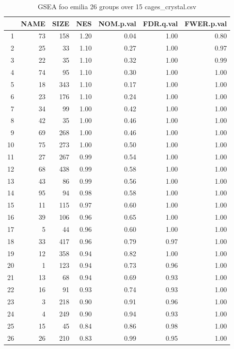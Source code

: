 \begin{table}[ht]
\centering
\begin{tabular}{rrrrrrr}
  \hline
 & NAME & SIZE & NES & NOM.p.val & FDR.q.val & FWER.p.val \\ 
  \hline
1 &  73 & 158 & 1.20 & 0.04 & 1.00 & 0.80 \\ 
  2 &  25 &  33 & 1.10 & 0.27 & 1.00 & 0.97 \\ 
  3 &  22 &  35 & 1.10 & 0.32 & 1.00 & 0.99 \\ 
  4 &  74 &  95 & 1.10 & 0.30 & 1.00 & 1.00 \\ 
  5 &  18 & 343 & 1.10 & 0.17 & 1.00 & 1.00 \\ 
  6 &  23 & 176 & 1.10 & 0.24 & 1.00 & 1.00 \\ 
  7 &  34 &  99 & 1.00 & 0.42 & 1.00 & 1.00 \\ 
  8 &  42 &  35 & 1.00 & 0.46 & 1.00 & 1.00 \\ 
  9 &  69 & 268 & 1.00 & 0.46 & 1.00 & 1.00 \\ 
  10 &  75 & 273 & 1.00 & 0.50 & 1.00 & 1.00 \\ 
  11 &  27 & 267 & 0.99 & 0.54 & 1.00 & 1.00 \\ 
  12 &  68 & 438 & 0.99 & 0.58 & 1.00 & 1.00 \\ 
  13 &  43 &  86 & 0.99 & 0.56 & 1.00 & 1.00 \\ 
  14 &  95 &  94 & 0.98 & 0.58 & 1.00 & 1.00 \\ 
  15 &  11 & 115 & 0.97 & 0.60 & 1.00 & 1.00 \\ 
  16 &  39 & 106 & 0.96 & 0.65 & 1.00 & 1.00 \\ 
  17 &   5 &  44 & 0.96 & 0.60 & 1.00 & 1.00 \\ 
  18 &  33 & 417 & 0.96 & 0.79 & 0.97 & 1.00 \\ 
  19 &  12 & 358 & 0.94 & 0.82 & 1.00 & 1.00 \\ 
  20 &   1 & 123 & 0.94 & 0.73 & 0.96 & 1.00 \\ 
  21 &  13 &  68 & 0.94 & 0.69 & 0.93 & 1.00 \\ 
  22 &  16 &  91 & 0.93 & 0.74 & 0.93 & 1.00 \\ 
  23 &   3 & 218 & 0.90 & 0.91 & 0.96 & 1.00 \\ 
  24 &   4 & 249 & 0.90 & 0.94 & 0.93 & 1.00 \\ 
  25 &  15 &  45 & 0.84 & 0.86 & 0.98 & 1.00 \\ 
  26 &  26 & 210 & 0.83 & 0.99 & 0.95 & 1.00 \\ 
   \hline
\end{tabular}
\caption{GSEA foo emilia 26 groups over 15 cages\_crystal.csv} 
\label{cages_crystal.csv}
\end{table}
